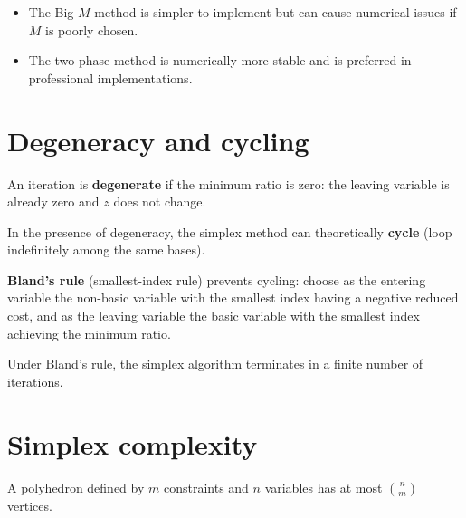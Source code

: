 \begin{bestpractice}[title=\textbf{Big-$M$ vs.\ two-phase}]
\begin{itemize}
  \item The Big-$M$ method is simpler to implement but can cause numerical
        issues if $M$ is poorly chosen.
  \item The two-phase method is numerically more stable and is preferred in
        professional implementations.
\end{itemize}
\end{bestpractice}

\section{Degeneracy and cycling}

\begin{definition}[Degeneracy]
An iteration is \textbf{degenerate} if the minimum ratio is zero: the
leaving variable is already zero and $z$ does not change.
\end{definition}

\begin{theorem}
In the presence of degeneracy, the simplex method can theoretically
\textbf{cycle} (loop indefinitely among the same bases).
\end{theorem}

\begin{definition}
\textbf{Bland's rule} (smallest-index rule) prevents cycling: choose as the
entering variable the non-basic variable with the smallest index having a
negative reduced cost, and as the leaving variable the basic variable with
the smallest index achieving the minimum ratio.
\end{definition}

\begin{theorem}
Under Bland's rule, the simplex algorithm terminates in a finite number of
iterations.
\end{theorem}

\section{Simplex complexity}

\begin{proposition}
A polyhedron defined by $m$ constraints and $n$ variables has at most
$\binom{n}{m}$ vertices.
\end{proposition}

